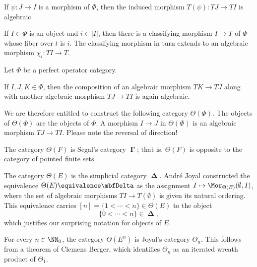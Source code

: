 \begin{eg}
	If $ \psi \colon J \to I $ is a morphism of $ \Phi $, then
	the induced morphism $ T(\psi) \colon TJ \to TI $ is algebraic.
\end{eg}

\begin{eg}
	If $ I \in \Phi $ is an object and $ i \in |I| $,
	then there is a classifying morphism $ I \to T $ of $ \Phi $
	whose fiber over $ t $ is $ i $.
	The classifying morphism in turn extends to
	an algebraic morphism $ \chi_i \colon TI \to T $.
\end{eg}

\begin{construction}
	Let $ \Phi $ be a perfect operator category.

	If $ I,J,K \in \Phi $, then 
	the composition of an algebraic morphism $ TK \to TJ $
	along with another algebraic morphism $ TJ \to TI $
	is again algebraic.
	
	We are therefore entitled to construct
	the following category $ \Theta(\Phi) $.
	The objects of $ \Theta(\Phi) $ are the objects of $ \Phi $.
	A morphism $ I \to J $ in $ \Theta(\Phi) $ is
	an algebraic morphism $ TJ \to TI $.
	Please note the reversal of direction!
\end{construction}

\begin{eg}
	The category $ \Theta(F) $ is Segal's category $ \mbfGamma $;
	that is, $ \Theta(F) $ is opposite to
	the category of pointed finite sets.
\end{eg}

\begin{eg}
	The category $ \Theta(E) $ is
	the simplicial category $ \mbfDelta $.
	André Joyal constructed
	the equivalence $ \Theta(E) \equivalence \mbfDelta $ as
	the assignment
	$ I \mapsto \Mor_{\Theta(E)}(\emptyset, I) $, where
	the set of algebraic morphisms $ TI \to T(\emptyset) $
	is given its natural ordering.
	This equivalence carries
	$ [n] = \{1 < \cdots < n\} \in \Theta(E) $ to the object
	\[ \{0 < \cdots < n\} \in \mbfDelta \comma \]
	which justifies our surprising notation for objects of $ E $.
\end{eg}

\begin{eg}
	For every $ n \in \NN_0 $, the category $ \Theta(E^n) $
	is Joyal's category $ \Theta _n $.
	This follows from a theorem of Clemens Berger,
	which identifies $ \Theta_n $ as an iterated wreath product of $ \Theta_1 $.
\end{eg}

